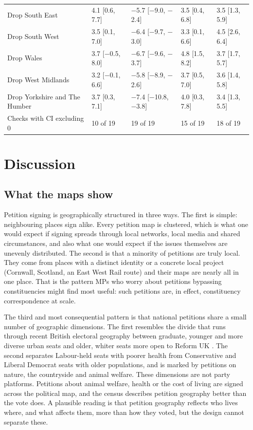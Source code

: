 \documentclass[11pt,a4paper]{article}
\begin{document}
\begin{table}[tbp]
\begin{tabular}{lllll}
Drop South East & 4.1 [0.6, 7.7] & $-$5.7 [$-$9.0, $-$2.4] & 3.5 [0.4, 6.8] & 3.5 [1.3, 5.9]\\
Drop South West & 3.5 [0.1, 7.0] & $-$6.4 [$-$9.7, $-$3.0] & 3.3 [0.1, 6.6] & 4.5 [2.6, 6.4]\\
Drop Wales & 3.7 [$-$0.5, 8.0] & $-$6.7 [$-$9.6, $-$3.7] & 4.8 [1.5, 8.2] & 3.7 [1.7, 5.7]\\
Drop West Midlands & 3.2 [$-$0.1, 6.6] & $-$5.8 [$-$8.9, $-$2.6] & 3.7 [0.5, 7.0] & 3.6 [1.4, 5.8]\\
Drop Yorkshire and The Humber & 3.7 [0.3, 7.1] & $-$7.4 [$-$10.8, $-$3.8] & 4.0 [0.3, 7.8] & 3.4 [1.3, 5.5]\\
\midrule Checks with CI excluding 0 & 10 of 19 & 19 of 19 & 15 of 19 & 18 of 19\\
\bottomrule\end{tabular}\end{table}

\section{Discussion}\label{sec:disc}
\subsection{What the maps show}
Petition signing is geographically structured in three ways. The first is simple: neighbouring places sign alike. Every petition map is clustered, which is what one would expect if signing spreads through local networks, local media and shared circumstances, and also what one would expect if the issues themselves are unevenly distributed. The second is that a minority of petitions are truly local. They come from places with a distinct identity or a concrete local project (Cornwall, Scotland, an East West Rail route) and their maps are nearly all in one place. That is the pattern MPs who worry about petitions bypassing constituencies \citep{matthews2021} might find most useful: such petitions are, in effect, constituency correspondence at scale.

The third and most consequential pattern is that national petitions share a small number of geographic dimensions. The first resembles the divide that runs through recent British electoral geography between graduate, younger and more diverse urban seats and older, whiter seats more open to Reform UK \citep{jenningsstoker2016,goodwinheath2016,beckeretal2017}. The second separates Labour-held seats with poorer health from Conservative and Liberal Democrat seats with older populations, and is marked by petitions on nature, the countryside and animal welfare. These dimensions are not party platforms. Petitions about animal welfare, health or the cost of living are signed across the political map, and the census describes petition geography better than the vote does. A plausible reading is that petition geography reflects who lives where, and what affects them, more than how they voted, but the design cannot separate these.
\end{document}
